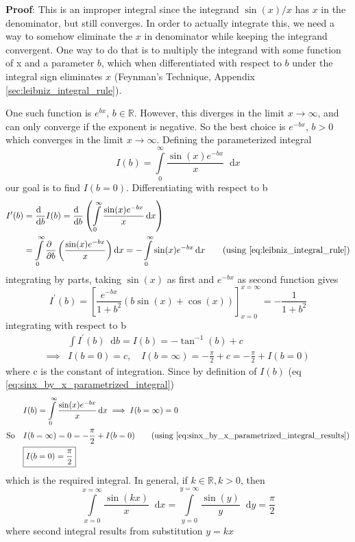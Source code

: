 \documentclass[11pt, a4paper]{article}
\newcommand{\eqrefnp}[1]{\textup{\ref{#1}}}  %
\newcommand{\primed}[1]{#1^{\prime}}
\newcommand{\diff}{\mathop{}\!\mathrm{d}}
\newcommand{\dx}{\diff x}
\newcommand{\dy}{\diff y}
\newcommand{\derv}[1]{\frac{\diff \hfill}{\diff #1}}	%
\newcommand{\dervb}[2]{\derv{#1} \left(#2\right)}  %
\newcommand{\pdiff}{\mathop{}\!\mathrm{\partial}} %
\newcommand{\pderv}[1]{\frac{\pdiff \hfill}{\pdiff #1}}	%
\newcommand{\pdervb}[2]{\pderv{#1} \left(#2\right)}  %
\newcommand{\dint}[2]{\int \limits_{#1}^{#2}}  %
\newcommand{\intzerotoinfty}{\dint{0}{\infty}}	%
\begin{document}
	\vspace{4pt}
	\textbf{Proof}: \cite{herman2016fourieranalysis} This is an improper integral since the integrand $\sin(x) / x$ has $x$ in the denominator, but still converges. In order to actually integrate this, we need a way to somehow eliminate the $x$ in denominator while keeping the integrand convergent. One way to do that is to multiply the integrand with some function of x and a parameter $b$, which when differentiated with respect to $b$ under the integral sign eliminates $x$ (Feynman's Technique, Appendix \ref{sec:leibniz_integral_rule}).
	
	One such function is $e^{bx}$, $b \in \mathbb{R}$. However, this diverges in the limit $x \to \infty$, and can only converge if the exponent is negative. So the best choice is $e^{-bx}$, $b > 0$ which converges in the limit $x \to \infty$. Defining the parameterized integral
	\begin{equation}\label{eq:sinx_by_x_parametrized_integral}
		I(b) = \intzerotoinfty \frac{\sin(x) e^{-bx}}{x} \dx
	\end{equation}
	our goal is to find $I(b=0)$. Differentiating with respect to b
	\begin{align*}
		\primed{I}(b) & = \derv{b}I(b) = \dervb{b}{\intzerotoinfty \frac{\sin(x) e^{-bx}}{x} \dx} \\
		& = \intzerotoinfty \pdervb{b}{\frac{\sin(x) e^{-bx}}{x}} \dx = -\intzerotoinfty \sin(x) e^{-bx} \dx \tag{using \eqrefnp{eq:leibniz_integral_rule}}
	\end{align*}
	integrating by parts, taking $\sin(x)$ as first and $e^{-bx}$ as second function gives
	\begin{equation*}
		\primed{I}(b) = \left[\frac{e^{-bx}}{1 + b^{2}} \left(b\sin(x) + \cos(x)\right)\right]_{x=0}^{x=\infty} = -\frac{1}{1 + b^{2}}
	\end{equation*}
	integrating with respect to b
	\begin{align}
		& \int \primed{I}(b) \diff b = I(b) = -\tan^{-1}(b) + c \nonumber \\
		\implies & I(b=0) = c, \quad I(b=\infty) = -\frac{\pi}{2} + c = -\frac{\pi}{2} + I(b=0) \label{eq:sinx_by_x_parametrized_integral_results}
	\end{align}
	where c is the constant of integration. Since by definition of $I(b)$ (eq \eqrefnp{eq:sinx_by_x_parametrized_integral})
	\begin{align*}
		& I(b) = \intzerotoinfty \frac{\sin(x) e^{-bx}}{x} \dx \implies I(b=\infty) = 0 \\
		\text{So} \quad & I(b=\infty) = 0 = -\frac{\pi}{2} + I(b=0) \tag{using \eqrefnp{eq:sinx_by_x_parametrized_integral_results}} \\
		& \boxed{I(b=0) = \frac{\pi}{2}}
	\end{align*}
	which is the required integral. In general, if $k \in \mathbb{R}, k > 0$, then
	\begin{equation}\label{eq:int_sinkx_by_x}
		\int \limits_{x=0}^{x=\infty} \frac{\sin(kx)}{x} \dx = \int \limits_{y=0}^{y=\infty} \frac{\sin(y)}{y} \dy = \frac{\pi}{2}
	\end{equation}
	where second integral results from substitution $y=kx$
\end{document}
